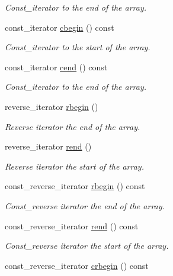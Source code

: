 \begin{DoxyCompactItemize}
\begin{DoxyCompactList}\small\item\em Const\+\_\+iterator to the end of the array. \end{DoxyCompactList}\item 
const\+\_\+iterator \mbox{\hyperlink{classfake_1_1vector_a1fe60d8e10668ca0c3dab212e695ffc1}{cbegin}} () const
\begin{DoxyCompactList}\small\item\em Const\+\_\+iterator to the start of the array. \end{DoxyCompactList}\item 
const\+\_\+iterator \mbox{\hyperlink{classfake_1_1vector_a764ef70912d85b94b0b130f33d8fd093}{cend}} () const
\begin{DoxyCompactList}\small\item\em Const\+\_\+iterator to the end of the array. \end{DoxyCompactList}\item 
reverse\+\_\+iterator \mbox{\hyperlink{classfake_1_1vector_a7b2476e1382bbf1ce2d799122f62b06b}{rbegin}} ()
\begin{DoxyCompactList}\small\item\em Reverse iterator the end of the array. \end{DoxyCompactList}\item 
reverse\+\_\+iterator \mbox{\hyperlink{classfake_1_1vector_ad3653b40c34a276138f7e09f8db45ead}{rend}} ()
\begin{DoxyCompactList}\small\item\em Reverse iterator the start of the array. \end{DoxyCompactList}\item 
const\+\_\+reverse\+\_\+iterator \mbox{\hyperlink{classfake_1_1vector_ab66c5a88df51f894685fde8dc6c033b5}{rbegin}} () const
\begin{DoxyCompactList}\small\item\em Const\+\_\+reverse iterator the end of the array. \end{DoxyCompactList}\item 
const\+\_\+reverse\+\_\+iterator \mbox{\hyperlink{classfake_1_1vector_aa964e3b45beb15c3883d544e4f27a605}{rend}} () const
\begin{DoxyCompactList}\small\item\em Const\+\_\+reverse iterator the start of the array. \end{DoxyCompactList}\item 
const\+\_\+reverse\+\_\+iterator \mbox{\hyperlink{classfake_1_1vector_af8134189dd3977bd4037a10e6854ac9c}{crbegin}} () const

\end{DoxyCompactItemize}
